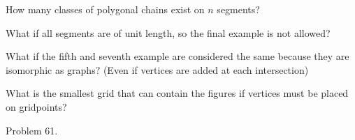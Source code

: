 \documentclass{article}
\begin{document}
  \begin{question}
    How many classes of polygonal chains exist on $n$ segments?
  \end{question}

  \begin{related}
    \item What if all segments are of unit length, so the final example is not
      allowed?
    \item What if the fifth and seventh example are considered the same because
      they are isomorphic as graphs? (Even if vertices are added at each
      intersection)
    \item What is the smallest grid that can contain the figures if vertices
      must be placed on gridpoints?
  \end{related}
  \begin{references}
    \item Problem 61.
  \end{references}
\end{document}
